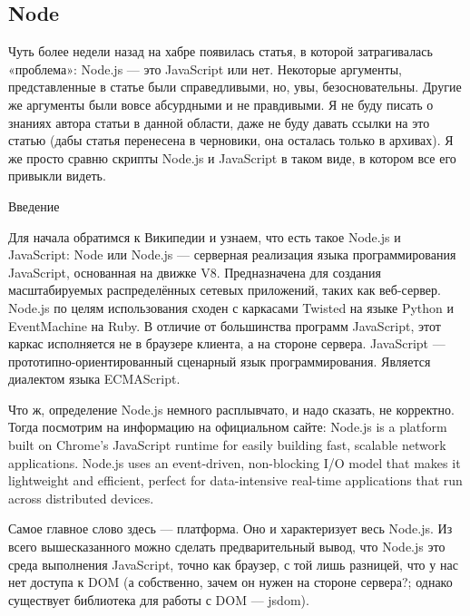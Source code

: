\subsection{Node}

Чуть более недели назад на хабре появилась статья, в которой затрагивалась «проблема»: Node.js — это JavaScript или нет. Некоторые аргументы, представленные в статье были справедливыми, но, увы, безосновательны. Другие же аргументы были вовсе абсурдными и не правдивыми. Я не буду писать о знаниях автора статьи в данной области, даже не буду давать ссылки на это статью (дабы статья перенесена в черновики, она осталась только в архивах). Я же просто сравню скрипты Node.js и JavaScript в таком виде, в котором все его привыкли видеть.

Введение

Для начала обратимся к Википедии и узнаем, что есть такое Node.js и JavaScript:
Node или Node.js — серверная реализация языка программирования JavaScript, основанная на движке V8. Предназначена для создания масштабируемых распределённых сетевых приложений, таких как веб-сервер. Node.js по целям использования сходен с каркасами Twisted на языке Python и EventMachine на Ruby. В отличие от большинства программ JavaScript, этот каркас исполняется не в браузере клиента, а на стороне сервера.
JavaScript — прототипно-ориентированный сценарный язык программирования. Является диалектом языка ECMAScript.

Что ж, определение Node.js немного расплывчато, и надо сказать, не корректно. Тогда посмотрим на информацию на официальном сайте:
Node.js is a platform built on Chrome's JavaScript runtime for easily building fast, scalable network applications. Node.js uses an event-driven, non-blocking I/O model that makes it lightweight and efficient, perfect for data-intensive real-time applications that run across distributed devices.

Самое главное слово здесь — платформа. Оно и характеризует весь Node.js. Из всего вышесказанного можно сделать предварительный вывод, что Node.js это среда выполнения JavaScript, точно как браузер, с той лишь разницей, что у нас нет доступа к DOM (а собственно, зачем он нужен на стороне сервера?; однако существует библиотека для работы с DOM — jsdom).
